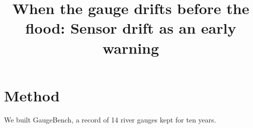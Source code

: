 \documentclass{article}
\title{When the gauge drifts before the flood: Sensor drift as an early warning}
\begin{document}
\maketitle
\section{Method}
We built GaugeBench, a record of 14 river gauges kept for ten years.
\end{document}
